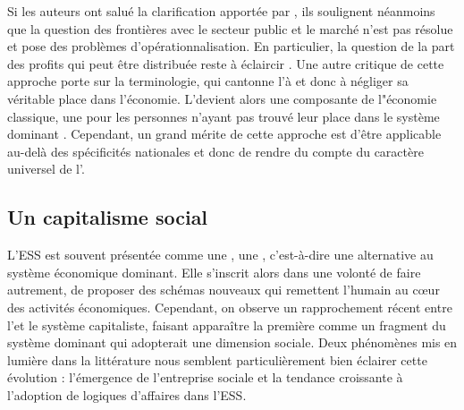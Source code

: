             Si les auteurs ont salué la clarification apportée par \textcite{salamon2016beyond}, ils soulignent néanmoins que la question des frontières avec le secteur public et le marché n’est pas résolue et pose des problèmes d’opérationnalisation. En particulier, la question de la part des profits qui peut être distribuée reste à éclaircir \parencite{defourny2016voluntas}. Une autre critique de cette approche porte sur la terminologie, qui cantonne l’\ess à  et donc à négliger sa véritable place dans l’économie. L'\ess devient alors une composante de l"économie classique, une  pour les personnes n'ayant pas trouvé leur place dans le système dominant \parencite{laville2011agir}. Cependant, un grand mérite de cette approche est d’être applicable au-delà des spécificités nationales et donc de rendre du compte du caractère universel de l’\ess \parencite{draperi2015leconomie}.


        \subsection{Un capitalisme social}

            L’ESS est souvent présentée comme une , une , c’est-à-dire une alternative au système économique dominant. Elle s’inscrit alors dans une volonté de faire autrement, de proposer des schémas nouveaux qui remettent l’humain au cœur des activités économiques. Cependant, on observe un rapprochement récent entre l’\ess et le système capitaliste, faisant apparaître la première comme un fragment du système dominant qui adopterait une dimension sociale. Deux phénomènes mis en lumière dans la littérature nous semblent particulièrement bien éclairer cette évolution : l’émergence de l’entreprise sociale et la tendance croissante à l’adoption de logiques d’affaires dans l’ESS. \\

